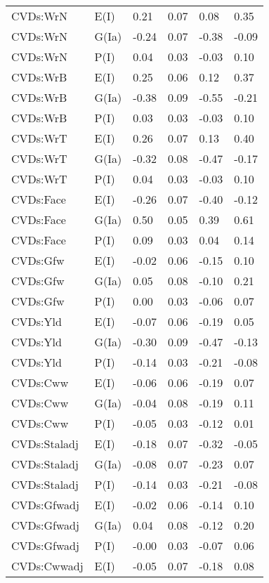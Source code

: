 \begin{center}
\begin{longtable}{|p{1.1in}|p{0.7in}|p{0.7in}|p{0.6in}|p{0.6in}|p{0.6in}|}
  CVDs:WrN & E(I) & 0.21 & 0.07 & 0.08 & 0.35 \\ 
  CVDs:WrN & G(Ia) & -0.24 & 0.07 & -0.38 & -0.09 \\ 
  CVDs:WrN & P(I) & 0.04 & 0.03 & -0.03 & 0.10 \\ 
  CVDs:WrB & E(I) & 0.25 & 0.06 & 0.12 & 0.37 \\ 
  CVDs:WrB & G(Ia) & -0.38 & 0.09 & -0.55 & -0.21 \\ 
  CVDs:WrB & P(I) & 0.03 & 0.03 & -0.03 & 0.10 \\ 
  CVDs:WrT & E(I) & 0.26 & 0.07 & 0.13 & 0.40 \\ 
  CVDs:WrT & G(Ia) & -0.32 & 0.08 & -0.47 & -0.17 \\ 
  CVDs:WrT & P(I) & 0.04 & 0.03 & -0.03 & 0.10 \\ 
  CVDs:Face & E(I) & -0.26 & 0.07 & -0.40 & -0.12 \\ 
  CVDs:Face & G(Ia) & 0.50 & 0.05 & 0.39 & 0.61 \\ 
  CVDs:Face & P(I) & 0.09 & 0.03 & 0.04 & 0.14 \\ 
  CVDs:Gfw & E(I) & -0.02 & 0.06 & -0.15 & 0.10 \\ 
  CVDs:Gfw & G(Ia) & 0.05 & 0.08 & -0.10 & 0.21 \\ 
  CVDs:Gfw & P(I) & 0.00 & 0.03 & -0.06 & 0.07 \\ 
  CVDs:Yld & E(I) & -0.07 & 0.06 & -0.19 & 0.05 \\ 
  CVDs:Yld & G(Ia) & -0.30 & 0.09 & -0.47 & -0.13 \\ 
  CVDs:Yld & P(I) & -0.14 & 0.03 & -0.21 & -0.08 \\ 
  CVDs:Cww & E(I) & -0.06 & 0.06 & -0.19 & 0.07 \\ 
  CVDs:Cww & G(Ia) & -0.04 & 0.08 & -0.19 & 0.11 \\ 
  CVDs:Cww & P(I) & -0.05 & 0.03 & -0.12 & 0.01 \\ 
  CVDs:Staladj & E(I) & -0.18 & 0.07 & -0.32 & -0.05 \\ 
  CVDs:Staladj & G(Ia) & -0.08 & 0.07 & -0.23 & 0.07 \\ 
  CVDs:Staladj & P(I) & -0.14 & 0.03 & -0.21 & -0.08 \\ 
  CVDs:Gfwadj & E(I) & -0.02 & 0.06 & -0.14 & 0.10 \\ 
  CVDs:Gfwadj & G(Ia) & 0.04 & 0.08 & -0.12 & 0.20 \\ 
  CVDs:Gfwadj & P(I) & -0.00 & 0.03 & -0.07 & 0.06 \\ 
  CVDs:Cwwadj & E(I) & -0.05 & 0.07 & -0.18 & 0.08 \\ 

\end{longtable}
\end{center}
